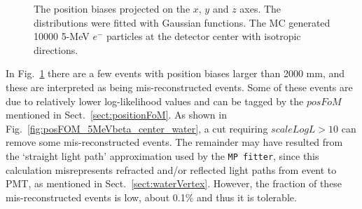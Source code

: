 \begin{figure}[htbp]
{\begin{minipage}[b]{0.4\textwidth}
		\end{minipage}
	}
	\caption[The position biases projected on the $x$, $y$ and $z$ axes.]{The position biases projected on the $x$, $y$ and $z$ axes. The distributions were fitted with Gaussian functions. The MC generated 10000 5-MeV $e^-$ particles at the detector center with isotropic directions.\label{fig:5MeVbeta_center_water}}
\end{figure}

In Fig.~\ref{fig:5MeVbeta_center_water} there are a few events with position biases larger than 2000 mm, and these are interpreted as being mis-reconstructed events. Some of these events are due to relatively lower log-likelihood values and can be tagged by the $posFoM$ mentioned in Sect.~\ref{sect:positionFoM}. As shown in Fig.~\ref{fig:posFOM_5MeVbeta_center_water}, a cut requiring $scaleLogL>10$ can remove some mis-reconstructed events. The remainder may have resulted from the `straight light path' approximation used by the \texttt{MP fitter}, since this calculation misrepresents refracted and/or reflected light paths from event to PMT, as mentioned in Sect.~\ref{sect:waterVertex}. However, the fraction of these mis-reconstructed events is low, about 0.1\% and thus it is tolerable.

